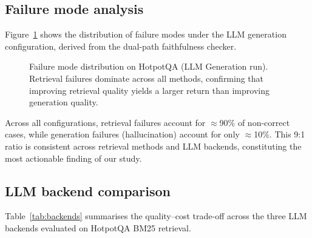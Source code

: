 \documentclass{article}
\begin{document}
\subsection{Failure mode analysis}

Figure~\ref{fig:failure} shows the distribution of failure modes under
the LLM generation configuration, derived from the dual-path faithfulness
checker.

\begin{figure}[h]
\centering
{}
\caption{Failure mode distribution on HotpotQA (LLM Generation run).
Retrieval failures dominate across all methods, confirming that improving
retrieval quality yields a larger return than improving generation quality.}
\label{fig:failure}
\end{figure}

Across all configurations, retrieval failures account for $\approx$90\%
of non-correct cases, while generation failures (hallucination) account
for only $\approx$10\%.  This 9:1 ratio is consistent across retrieval
methods and LLM backends, constituting the most actionable finding of
our study.

\subsection{LLM backend comparison}

Table~\ref{tab:backends} summarises the quality–cost trade-off across
the three LLM backends evaluated on HotpotQA BM25 retrieval.
\end{document}
